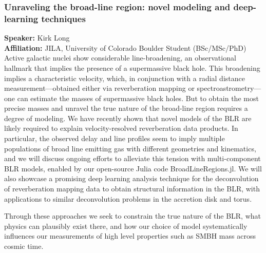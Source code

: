\subsubsection*{Unraveling the broad-line region: novel modeling and deep-learning techniques}
\textbf{Speaker:} Kirk Long \\
\textbf{Affiliation:} JILA, University of Colorado Boulder \textperiodcentered{} Student (BSc/MSc/PhD)\\
Active galactic nuclei show considerable line-broadening, an observational hallmark that implies the presence of a supermassive black hole. This broadening implies a characteristic velocity, which, in conjunction with a radial distance measurement—obtained either via reverberation mapping or spectroastrometry—one can estimate the masses of supermassive black holes. But to obtain the most precise masses and unravel the true nature of the broad-line region requires a degree of modeling. We have recently shown that novel models of the BLR are likely required to explain velocity-resolved reverberation data products. In particular, the observed delay and line profiles seem to imply multiple populations of broad line emitting gas with different geometries and kinematics, and we will discuss ongoing efforts to alleviate this tension with multi-component BLR models, enabled by our open-source Julia code BroadLineRegions.jl. We will also showcase a promising deep learning analysis technique for the deconvolution of reverberation mapping data to obtain structural information in the BLR, with applications to similar deconvolution problems in the accretion disk and torus.

Through these approaches we seek to constrain the true nature of the BLR, what physics can plausibly exist there, and how our choice of model systematically influences our measurements of high level properties such as SMBH mass across cosmic time.

\hypertarget{abs-20}{}
